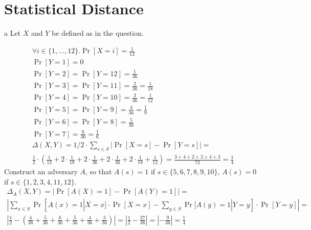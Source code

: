 \documentclass{article}
\begin{document}
\section{Statistical Distance}
\begin{paragraph}
	a Let $X$ and $Y$ be defined as in the question.

	\begin{gather*}
		\forall i \in \{1, ... , 12\}. \Pr[X = i] = \frac{1}{12}\\
		\Pr[Y = 1] = 0\\
		\Pr[Y = 2] = \Pr[Y = 12] = \frac{1}{36}\\
		\Pr[Y = 3] = \Pr[Y = 11] = \frac{2}{36} = \frac{1}{18}\\
		\Pr[Y = 4] = \Pr[Y = 10] = \frac{3}{36} = \frac{1}{12}\\
		\Pr[Y = 5] = \Pr[Y = 9] = \frac{4}{36} = \frac{1}{9}\\
		\Pr[Y = 6] = \Pr[Y = 8] = \frac{5}{36}\\
		\Pr[Y = 7] = \frac{6}{36} = \frac{1}{6}\\
		\Delta(X, Y) = 1/2 \cdot \sum\limits_{s \in S}|\Pr[X = s] - \Pr[Y = s]| =\\
		\frac{1}{2} \cdot \left(\frac{1}{12} + 2 \cdot \frac{1}{18} + 2 \cdot \frac{1}{36} + 2 \cdot \frac{1}{36} + 2 \cdot \frac{1}{18} + \frac{1}{12}\right) = \frac{3 + 4 + 2 + 2 + 4 + 3}{72} = \frac{1}{4}
	\end{gather*}
	Construct an adversary $A$, so that $A(s) = 1$ if $s \in \{5, 6, 7, 8, 9, 10\}$, $A(s) = 0$ if $s \in \{1, 2, 3, 4, 11, 12\}$.
	\begin{gather*}
		\Delta_A(X, Y) = |\Pr[A(X) = 1] - \Pr[A(Y) = 1]| =\\
		|\sum\limits_{x \in S}\Pr[A(x) = 1| X = x] \cdot \Pr[X = x] - \sum\limits_{y \in S}\Pr[A(y) = 1| Y = y] \cdot \Pr[Y = y]| = \\
		|\frac{1}{2} - \left(\frac{4}{36} + \frac{5}{36} + \frac{6}{36} + \frac{5}{36} + \frac{4}{36} + \frac{3}{36}\right)| = |\frac{1}{2} - \frac{27}{36}| = |-\frac{9}{36}| = \frac{1}{4}
	\end{gather*}
\end{paragraph}
\end{document}
